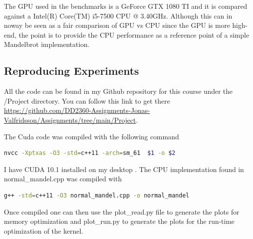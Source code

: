 \documentclass{article}
\begin{document}
The GPU used in the benchmarks is a GeForce GTX 1080 TI and it is compared against a Intel(R)
Core(TM) i5-7500 CPU @ 3.40GHz. Although this can in noway be seen as a fair comparison of
GPU vs CPU since the GPU is more high-end, the point is to provide the CPU performance as a
reference point of a simple Mandelbrot implementation.

\subsection{Reproducing Experiments}%
\label{ssub:compiling}

All the code can be found in my Github repository for this course under the /Project
directory. You can follow this link to get there
\href{https://github.com/DD2360-Assignments-Jonas-Valfridsson/Assignments/tree/main/Project}{https://github.com/DD2360-Assignments-Jonas-Valfridsson/Assignments/tree/main/Project}.

The Cuda code was compiled with the following command

\begin{mdframed}[backgroundcolor=codeColor,leftmargin=0.0cm,hidealllines=true,%
  innerleftmargin=0.1cm,innerrightmargin=0.1cm,innertopmargin=0.5cm,innerbottommargin=0.10cm,
  roundcorner=15pt]
\begin{lstlisting}[language=bash]
  nvcc -Xptxas -O3 -std=c++11 -arch=sm_61  $1 -o $2 
\end{lstlisting}
\end{mdframed}

I have CUDA 10.1 installed on my desktop \cite{cuda-version}. The CPU implementation found in
normal\_mandel.cpp was compiled with 

\begin{mdframed}[backgroundcolor=codeColor,leftmargin=0.0cm,hidealllines=true,%
  innerleftmargin=0.1cm,innerrightmargin=0.1cm,innertopmargin=0.5cm,innerbottommargin=0.10cm,
  roundcorner=15pt]
\begin{lstlisting}[language=bash]
  g++ -std=c++11 -O3 normal_mandel.cpp -o normal_mandel
\end{lstlisting}
\end{mdframed}


Once compiled one can then use the plot\_read.py file to generate the plots for memory optimization and
plot\_run.py to generate the plots for the run-time optimization of the kernel. 
\end{document}
